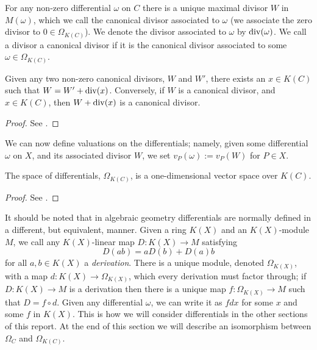     \begin{defnlem}
    For any non-zero differential $\omega$ on $C$ there is a unique maximal divisor $W$ in $M(\omega)$, which we call the {\rm canonical divisor associated to $\omega$} (we associate the zero divisor to $0\in \Omega_{K(C)}$).
    We denote the divisor associated to $\omega$ by $\operatorname{div} (\omega)$.
    We call a divisor a {\rm canonical divisor} if it is the canonical divisor associated to some $\omega \in \Omega_{K(C)}$.
    
    Given any two non-zero canonical divisors, $W$ and $W'$, there exists an $x\in K(C)$ such that $W = W' + \operatorname{div}(x)$.
    Conversely, if $W$ is a canonical divisor, and $x\in K(C)$, then $W + \operatorname{div}(x)$ is a canonical divisor.
    \end{defnlem}
    \begin{proof}
    See \cite[Lem. 1.5.10 and Prop. 1.5.13]{stichtenoth}.
    \end{proof}

We can now define valuations on the differentials; namely, given some differential $\omega $ on $X$, and its associated divisor $W$, we set $v_P(\omega):=v_P(W)$ for $P\in X$.




    \begin{prop}
    The space of differentials, $\Omega_{K(C)}$, is a one-dimensional vector space over $K(C)$.
    \end{prop}
    \begin{proof}
    See \cite[Prop. 1.5.9]{stichtenoth}.
    \end{proof}



It should be noted that in algebraic geometry differentials are normally defined in a different, but equivalent, manner.
Given a ring $K(X)$ and an $K(X)$-module $M$, we call any $K(X)$-linear map $D\colon K(X)\rightarrow M$ satisfying \[D(ab) = aD(b) + D(a)b\] for all $a,b\in K(X)$ a {\em derivation}.
There is a unique module, denoted $\Omega_{K(X)}$, with a map $d\colon K(X) \rightarrow \Omega_{K(X)}$, which every derivation must factor through; \ie if $D\colon K(X)\rightarrow M$ is a derivation then there is a unique map $f\colon \Omega_{K(X)}\rightarrow M$ such that $D = f\circ d$.
Given any differential $\omega$, we can write it as $fdx$ for some $x$ and some $f$ in $K(X)$.
This is how we will consider differentials in the other sections of this report.
At the end of this section we will describe an isomorphism between $\Omega_C$ and $\Omega_{K(C)}$.

